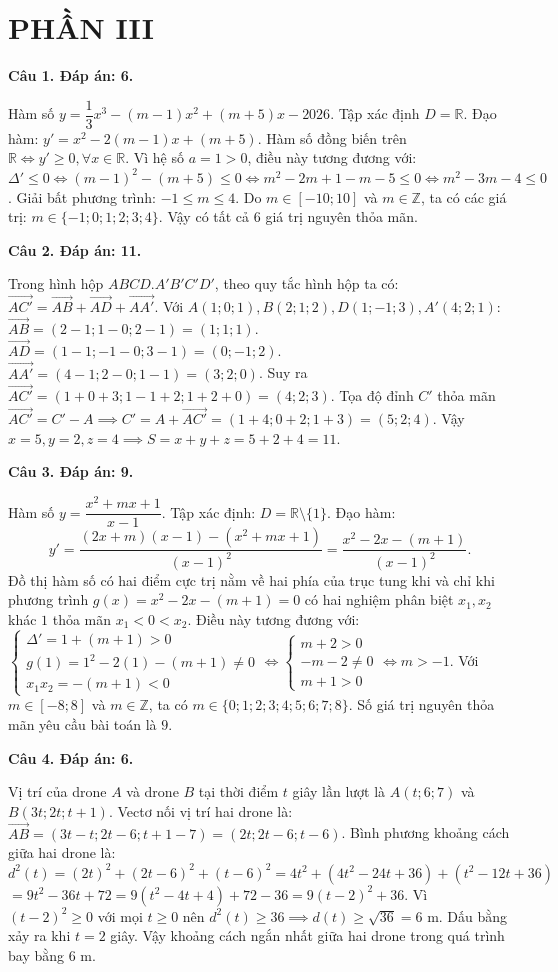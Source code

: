 \documentclass[12pt,a4paper]{article}
\newcommand{\loigiai}[1]{\par\medskip\Needspace{4\baselineskip}\noindent\textbf{#1}\par\nobreak}
\begin{document}
\newpage
\section*{PHẦN III}

\loigiai{Câu 1. Đáp án: 6.}
Hàm số $y=\dfrac{1}{3}x^3-(m-1)x^2+(m+5)x-2026$.
Tập xác định $D=\mathbb{R}$.
Đạo hàm: $y'=x^2-2(m-1)x+(m+5)$.
Hàm số đồng biến trên $\mathbb{R} \iff y'\ge 0, \forall x\in\mathbb{R}$.
Vì hệ số $a=1>0$, điều này tương đương với:
$\Delta'\le 0 \iff (m-1)^2-(m+5)\le 0 \iff m^2-2m+1-m-5\le 0 \iff m^2-3m-4\le 0$.
Giải bất phương trình: $-1\le m\le 4$.
Do $m\in[-10;10]$ và $m\in\mathbb{Z}$, ta có các giá trị: $m\in\{-1;0;1;2;3;4\}$.
Vậy có tất cả $6$ giá trị nguyên thỏa mãn.

\loigiai{Câu 2. Đáp án: 11.}
Trong hình hộp $ABCD.A'B'C'D'$, theo quy tắc hình hộp ta có:
$\vec{AC'}=\vec{AB}+\vec{AD}+\vec{AA'}$.
Với $A(1;0;1), B(2;1;2), D(1;-1;3), A'(4;2;1)$:
$\vec{AB}=(2-1; 1-0; 2-1)=(1;1;1)$.
$\vec{AD}=(1-1; -1-0; 3-1)=(0;-1;2)$.
$\vec{AA'}=(4-1; 2-0; 1-1)=(3;2;0)$.
Suy ra $\vec{AC'}=(1+0+3; 1-1+2; 1+2+0)=(4;2;3)$.
Tọa độ đỉnh $C'$ thỏa mãn $\vec{AC'}=C'-A \implies C'=A+\vec{AC'}=(1+4; 0+2; 1+3)=(5;2;4)$.
Vậy $x=5, y=2, z=4 \implies S=x+y+z=5+2+4=11$.

\loigiai{Câu 3. Đáp án: 9.}
Hàm số $y=\dfrac{x^2+mx+1}{x-1}$. Tập xác định: $D=\mathbb{R}\setminus\{1\}$.
Đạo hàm:
\[
y'=\dfrac{(2x+m)(x-1)-(x^2+mx+1)}{(x-1)^2} = \dfrac{x^2-2x-(m+1)}{(x-1)^2}.
\]
Đồ thị hàm số có hai điểm cực trị nằm về hai phía của trục tung khi và chỉ khi phương trình $g(x)=x^2-2x-(m+1)=0$ có hai nghiệm phân biệt $x_1, x_2$ khác $1$ thỏa mãn $x_1 < 0 < x_2$.
Điều này tương đương với:
$\begin{cases} \Delta' = 1 + (m+1) > 0 \\ g(1) = 1^2 - 2(1) - (m+1) \ne 0 \\ x_1 x_2 = -(m+1) < 0 \end{cases}
\iff \begin{cases} m+2 > 0 \\ -m-2 \ne 0 \\ m+1 > 0 \end{cases} \iff m > -1$.
Với $m\in[-8;8]$ và $m\in\mathbb{Z}$, ta có $m\in\{0;1;2;3;4;5;6;7;8\}$.
Số giá trị nguyên thỏa mãn yêu cầu bài toán là $9$.

\loigiai{Câu 4. Đáp án: 6.}
Vị trí của drone $A$ và drone $B$ tại thời điểm $t$ giây lần lượt là $A(t;6;7)$ và $B(3t;2t;t+1)$.
Vectơ nối vị trí hai drone là:
$\vec{AB}=(3t-t; 2t-6; t+1-7)=(2t; 2t-6; t-6)$.
Bình phương khoảng cách giữa hai drone là:
$d^2(t)=(2t)^2+(2t-6)^2+(t-6)^2 = 4t^2 + (4t^2-24t+36) + (t^2-12t+36)$
$= 9t^2 - 36t + 72 = 9(t^2-4t+4) + 72 - 36 = 9(t-2)^2 + 36$.
Vì $(t-2)^2\ge 0$ với mọi $t\ge 0$ nên $d^2(t)\ge 36 \implies d(t)\ge \sqrt{36}=6\text{ m}$.
Dấu bằng xảy ra khi $t=2$ giây.
Vậy khoảng cách ngắn nhất giữa hai drone trong quá trình bay bằng $6\text{ m}$.
\end{document}
